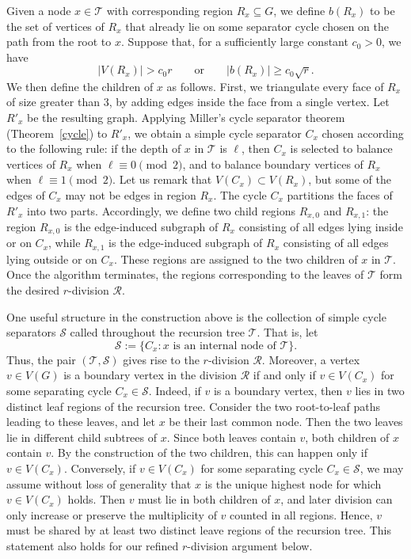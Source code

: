 \documentclass[11pt]{article}
\theoremstyle{plain}
\theoremstyle{definition}
\theoremstyle{remark}
\begin{document}
Given a node \(x\in\mathcal T\) with corresponding region \(R_x\subseteq G\),  we define $b(R_x)$ to be the set of vertices of $R_x$ that already lie on some separator cycle chosen on the path from the root to $x$. Suppose that, for a sufficiently large constant \(c_0>0\), we have
\[
|V(R_x)|>c_0r
\qquad\text{or}\qquad
|b(R_x)|\ge c_0\sqrt r.
\]
We then define the children of \(x\) as follows.  
First, we triangulate every face of \(R_x\) of size greater than 3, by adding edges inside the face from a single vertex.  Let $R'_x$ be the resulting graph.  
Applying Miller's cycle separator theorem (Theorem~\ref{cycle}) to \(R'_x\), we obtain a simple cycle separator \(C_x\) chosen according to the following rule: if the depth of \(x\) in \(\mathcal T\) is \(\ell\), then \(C_x\) is selected to balance vertices of \(R_x\) when \(\ell\equiv 0\pmod 2\), and to balance boundary vertices of \(R_x\) when \(\ell\equiv 1\pmod 2\).  Let us remark that $V(C_x) \subset V(R_x)$, but some of the edges of $C_x$ may not be edges in region $R_x$.  The cycle \(C_x\) partitions the faces of \(R'_x\) into two parts. Accordingly, we define two child regions \(R_{x,0}\) and \(R_{x,1}\): the region \(R_{x,0}\) is the edge-induced subgraph of \(R_x\) consisting of all edges lying inside or on \(C_x\), while \(R_{x,1}\) is the edge-induced subgraph of \(R_x\) consisting of all edges lying outside or on \(C_x\).  These regions are assigned to the two children of \(x\) in \(\mathcal T\).  
Once the algorithm terminates, the regions corresponding to the leaves of \(\mathcal T\) form the desired \(r\)-division \(\mathcal R\).  

One useful structure in the construction above is the collection of simple cycle separators \(\mathcal S\) called throughout the recursion tree \(\mathcal T\).  
That is, let
\[
\mathcal S:=\{C_x:x\text{ is an internal node of }\mathcal T\}.
\]
Thus, the pair \((\mathcal T,\mathcal S)\) gives rise to the \(r\)-division \(\mathcal R\).  
Moreover, a vertex \(v\in V(G)\) is a boundary vertex in the division \(\mathcal R\) if and only if \(v\in V(C_x)\) for some separating cycle \(C_x\in\mathcal S\).  Indeed, if
\(v\) is a boundary vertex, then \(v\) lies in two distinct leaf regions of the
recursion tree.  Consider the two root-to-leaf paths leading to these leaves,
and let \(x\) be their last common node.  Then the two leaves lie in different
child subtrees of \(x\).  Since both leaves contain \(v\), both children of
\(x\) contain \(v\).  By the construction of the two children, this can happen
only if \(v\in V(C_x)\). Conversely, if \(v\in V(C_x)\) for some separating cycle \(C_x\in\mathcal S\), we may assume without loss of generality that $x$ is the unique highest node for which \(v\in V(C_x)\) holds. Then $v$ must lie in both children of $x$, and later division can only increase or preserve the multiplicity of $v$ counted in all regions. Hence, $v$ must be shared by at least two distinct leave regions of the recursion tree. This statement also holds for our refined $r$-division argument below. 
   
\end{document}
